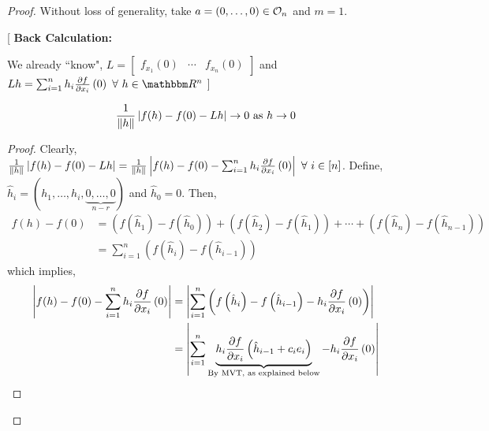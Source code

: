 \documentclass[../Analysis-3]{subfiles}
\begin{document}
\begin{proof}
  Without loss of generality, take $ a = (0,\ldots,0) \in \mathcal{O}_{n} $ and $ m = 1 $.

    [
      \textbf{Back Calculation:}

      We already ``know", $ L = \begin{bmatrix}
          f_{x_1}(0) & \cdots & f_{x_n}(0)
        \end{bmatrix} $ and $ Lh = \sum_{i=1}^{n}h_i\pdv{f}{x_i}\left( 0 \right)\ \forall\ h \in \R^n $
    ]

  \begin{clmBox}
    \begin{align*}
      \frac{1}{\norm{h}}\left| f(h)-f(0)-Lh \right| \to 0 \text{ as } h \to 0
    \end{align*}
  \end{clmBox}

  \begin{proof}
    Clearly, $ \frac{1}{\norm{h}}\left| f(h)-f(0)-Lh \right| = \frac{1}{\norm{h}}\left| f(h)-f(0)-\sum_{i=1}^{n}h_i\pdv{f}{x_i}\left( 0 \right) \right|\ \forall\ i \in [n]$. Define, $ \hat{h}_i = (h_1, \ldots, h_i, \underbrace{0,\ldots,0}_{n-r}) $ and $ \hat{h}_0  = 0 $. Then,
    \begin{align*}
      f(h)-f(0) & = \left( f\left(\hat{h}_1\right) - f\left(\hat{h}_0\right) \right) + \left( f\left(\hat{h}_2\right) - f\left(\hat{h}_1\right) \right) + \cdots + \left( f\left(\hat{h}_{n}\right) - f\left(\hat{h}_{n-1}\right) \right) \\
                & =\sum_{i=1}^{n} \left( f\left(\hat{h}_{i}\right) - f\left(\hat{h}_{i-1}\right) \right)
    \end{align*}
    which implies, \begin{align*}
      \left| f(h)-f(0)-\sum_{i=1}^{n}h_i\pdv{f}{x_i}\left( 0 \right) \right| & = \left| \sum_{i=1}^{n} \left( f\left(\hat{h}_{i}\right) - f\left(\hat{h}_{i-1}\right) - h_i\pdv{f}{x_i}\left( 0 \right) \right) \right|                                \\
                                                                             & = \left| \sum_{i=1}^{n} \underbrace{h_i\pdv{f}{x_i}\left( \hat{h}_{i-1} + c_ie_i \right)}_{\text{By MVT, as explained below}} - h_i\pdv{f}{x_i}\left( 0 \right) \right|
    \end{align*}


\end{proof}
\end{proof}
\end{document}
